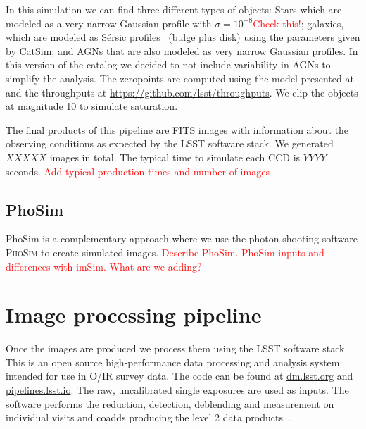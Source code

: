 \documentclass[\docopts]{\docclass}
\begin{document}
In this simulation we can find three different types of objects: Stars which are modeled as a very narrow Gaussian profile
with $\sigma=10^{-8}$\textcolor{red}{Check this!}; galaxies, which are modeled as S\'{e}rsic profiles~\citep{1963BAAA....6...41S} (bulge plus disk) using
the parameters given by CatSim; and AGNs that are also modeled as very narrow Gaussian profiles. In this version of the catalog we decided
to not include variability in AGNs to simplify the analysis. The zeropoints are computed using the model presented at~\citep{2008arXiv0805.2366I} and the
throughputs at \url{https://github.com/lsst/throughputs}. We clip the objects at magnitude 10 to simulate saturation.

The final products of this pipeline are FITS images with information about the observing conditions as expected by the LSST software stack. We generated
$XXXXX$ images in total. The typical time to simulate each CCD is $YYYY$ seconds.
\textcolor{red}{Add typical production times and number of images}



\subsection{PhoSim}
\label{sec:phosim_pipeline}

PhoSim is a complementary approach where we use the photon-shooting software \textsc{PhoSim} to create simulated images.
\textcolor{red}{Describe PhoSim. PhoSim inputs and differences with imSim. What are we adding?}

\section{Image processing pipeline}
\label{sec:image_processing_pipeline}

Once the images are produced we process them using the LSST software stack~\citep{2015arXiv151207914J}. This is an open
source high-performance data processing and analysis system intended for use in O/IR survey data. The code can be found at
\url{dm.lsst.org} and \url{pipelines.lsst.io}. The raw, uncalibrated single exposures are used as inputs. The software performs
the reduction, detection, deblending and measurement on individual visits and coadds producing the level 2 data
products~\citep{2015arXiv151207914J}.
\end{document}
